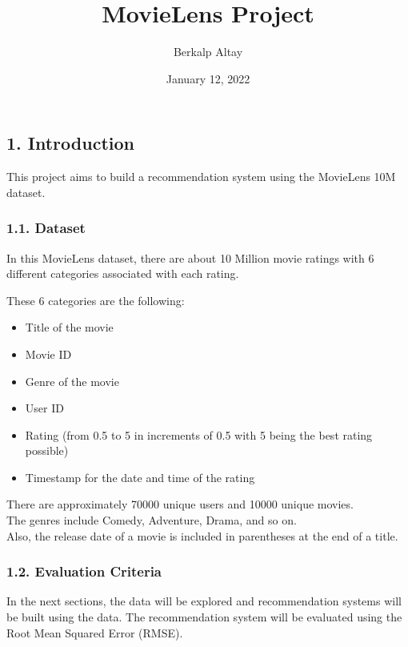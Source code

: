 \documentclass[
]{article}
\title{MovieLens Project}
\author{Berkalp Altay}
\date{January 12, 2022}
\begin{document}
\maketitle

{
\setcounter{tocdepth}{3}
\tableofcontents
}
\newpage

\hypertarget{introduction}{%
\subsection{1. Introduction}\label{introduction}}

This project aims to build a recommendation system using the MovieLens
10M dataset.

\hypertarget{dataset}{%
\subsubsection{1.1. Dataset}\label{dataset}}

In this MovieLens dataset, there are about 10 Million movie ratings with
6 different categories associated with each rating.

These 6 categories are the following:

\begin{itemize}
\item
  Title of the movie
\item
  Movie ID
\item
  Genre of the movie
\item
  User ID
\item
  Rating (from 0.5 to 5 in increments of 0.5 with 5 being the best
  rating possible)
\item
  Timestamp for the date and time of the rating
\end{itemize}

There are approximately 70000 unique users and 10000 unique movies.\\
The genres include Comedy, Adventure, Drama, and so on.\\
Also, the release date of a movie is included in parentheses at the end
of a title.

\hypertarget{evaluation-criteria}{%
\subsubsection{1.2. Evaluation Criteria}\label{evaluation-criteria}}

In the next sections, the data will be explored and recommendation
systems will be built using the data. The recommendation system will be
evaluated using the Root Mean Squared Error (RMSE).\\
\end{document}
